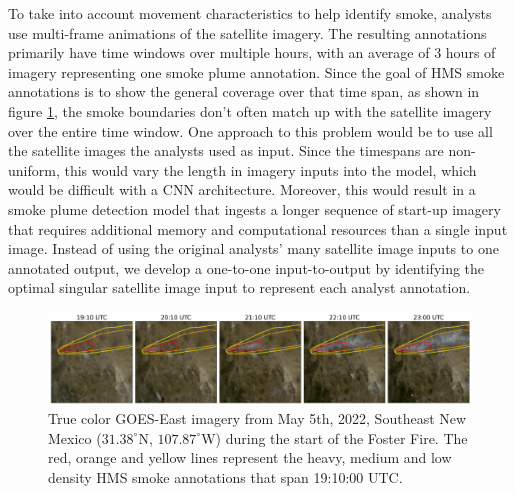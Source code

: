 \documentclass{article}
\begin{document}
To take into account movement characteristics to help identify smoke, analysts use multi-frame animations of the satellite imagery. The resulting annotations primarily have time windows over multiple hours, with an average of 3 hours of imagery representing one smoke plume annotation. Since the goal of HMS smoke annotations is to show the general coverage over that time span, as shown in figure \ref{timelapse}, the smoke boundaries don't often match up with the satellite imagery over the entire time window. One approach to this problem would be to use all the satellite images the analysts used as input. Since the timespans are non-uniform, this would vary the length in imagery inputs into the model, which would be difficult with a CNN architecture. Moreover, this would result in a smoke plume detection model that ingests a longer sequence of start-up imagery that requires additional memory and computational resources than a single input image. Instead of using the original analysts' many satellite image inputs to one annotated output, we develop a one-to-one input-to-output by identifying the optimal singular satellite image input to represent each analyst annotation. 

\begin{figure}[!htb]
    \centering
    \includegraphics[width=\linewidth]{figures/timelapse_small.png}
    \caption{True color GOES-East imagery from May 5th, 2022, Southeast New Mexico (\(31.38^{\circ}\)N, \(107.87^{\circ}\)W) during the start of the Foster Fire. The red, orange and yellow lines represent the heavy, medium and low density HMS smoke annotations that span 19:10:00 UTC.}
    \label{timelapse}
\end{figure}
\end{document}
